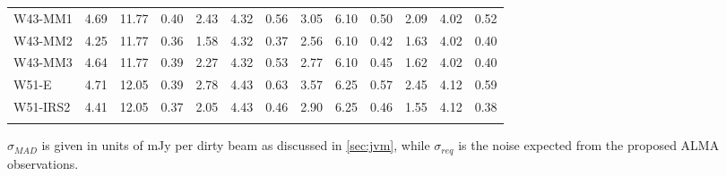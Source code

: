 \begin{table}[htbp!]
\begin{tabular}{@{\extracolsep{4pt}}lllllllllllll@{}}
W43-MM1  &  4.69 & 11.77 & 0.40 & 2.43 & 4.32 & 0.56 & 3.05 & 6.10 & 0.50 & 2.09 & 4.02 & 0.52 \\
W43-MM2  &  4.25 & 11.77 & 0.36 & 1.58 & 4.32 & 0.37 & 2.56 & 6.10 & 0.42 & 1.63 & 4.02 & 0.40 \\
W43-MM3  &  4.64 & 11.77 & 0.39 & 2.27 & 4.32 & 0.53 & 2.77 & 6.10 & 0.45 & 1.62 & 4.02 & 0.40 \\
W51-E  &  4.71 & 12.05 & 0.39 & 2.78 & 4.43 & 0.63 & 3.57 & 6.25 & 0.57 & 2.45 & 4.12 & 0.59 \\
W51-IRS2  &  4.41 & 12.05 & 0.37 & 2.05 & 4.43 & 0.46 & 2.90 & 6.25 & 0.46 & 1.55 & 4.12 & 0.38 \\

\hline \noalign {\smallskip}
\end{tabular}
\begin{tablenotes}
\item $\sigma_{MAD}$ is given in units of mJy per dirty beam as discussed in \cref{sec:jvm}, while $\sigma_{req}$ is the noise expected from the proposed ALMA observations.

\end{tablenotes}
\end{table}
